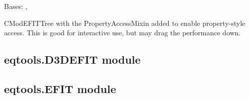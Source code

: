 \documentclass[letterpaper,10pt,english]{sphinxmanual}
\begin{document}

\begin{fulllineitems}
\label{eqtools:eqtools.CModEFIT.CModEFITTreeProp}
Bases: {\hyperref[eqtools:eqtools.CModEFIT.CModEFITTree]{}}, {\hyperref[eqtools:eqtools.core.PropertyAccessMixin]{}}

CModEFITTree with the PropertyAccessMixin added to enable property-style
access. This is good for interactive use, but may drag the performance down.

\end{fulllineitems}



\subsection{eqtools.D3DEFIT module}
\label{eqtools:eqtools-d3defit-module}

\subsection{eqtools.EFIT module}
\label{eqtools:eqtools-efit-module}\label{eqtools:module-eqtools.EFIT}
\end{document}
